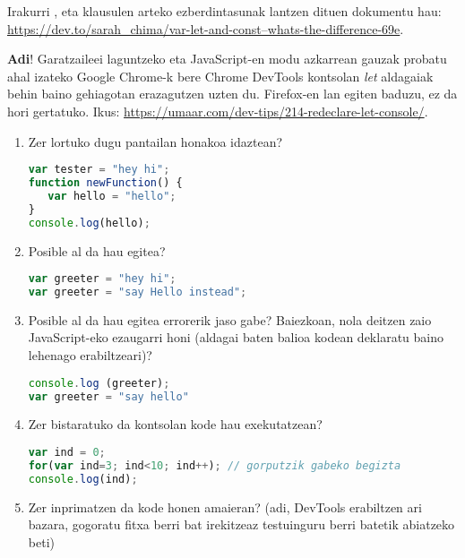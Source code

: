  Irakurri ,  eta  klausulen arteko ezberdintasunak lantzen dituen dokumentu hau: \\
 \href{ https://dev.to/sarah\_chima/var-let-and-const--whats-the-difference-69e}{https://dev.to/sarah\_chima/var-let-and-const--whats-the-difference-69e}.
    
    \textbf{Adi}! Garatzaileei laguntzeko eta JavaScript-en modu azkarrean gauzak probatu ahal izateko Google Chrome-k bere Chrome DevTools kontsolan \textit{let} aldagaiak behin baino gehiagotan erazagutzen uzten du. Firefox-en lan egiten baduzu, ez da hori gertatuko. Ikus: \href{https://umaar.com/dev-tips/214-redeclare-let-console/}{https://umaar.com/dev-tips/214-redeclare-let-console/}.
    
\begin{enumerate}
    \item Zer lortuko dugu pantailan honakoa idaztean?    
\begin{lstlisting}[language=JavaScript,numbers=none]
var tester = "hey hi";
function newFunction() {
   var hello = "hello";
}
console.log(hello);

\end{lstlisting}

\item Posible al da hau egitea?
\begin{lstlisting}[language=JavaScript,numbers=none]
var greeter = "hey hi";
var greeter = "say Hello instead";   
    \end{lstlisting}

\item  Posible al da hau egitea errorerik jaso gabe? Baiezkoan, nola deitzen zaio JavaScript-eko
ezaugarri honi (aldagai baten balioa kodean deklaratu baino lehenago erabiltzeari)?
\begin{lstlisting}[language=JavaScript,numbers=none]
console.log (greeter);
var greeter = "say hello"    
    \end{lstlisting}

\item  Zer bistaratuko da kontsolan kode hau exekutatzean?
\begin{lstlisting}[language=JavaScript,numbers=none]
var ind = 0;
for(var ind=3; ind<10; ind++); // gorputzik gabeko begizta
console.log(ind);

\end{lstlisting}

\item Zer inprimatzen da kode honen amaieran?
(adi, DevTools erabiltzen ari bazara, gogoratu fitxa berri bat irekitzeaz testuinguru berri batetik
abiatzeko beti)


\end{enumerate}
